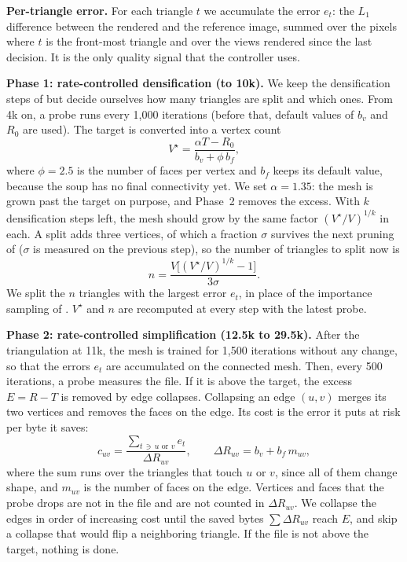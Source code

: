 \noindent\textbf{Per-triangle error.} For each triangle $t$ we accumulate the error $e_t$: the $L_1$ difference between the rendered and the reference image, summed over the pixels where $t$ is the front-most triangle and over the views rendered since the last decision. It is the only quality signal that the controller uses.

\noindent\textbf{Phase 1: rate-controlled densification (to 10k).} We keep the densification steps of \MS but decide ourselves how many triangles are split and which ones. From 4k on, a probe runs every 1{,}000 iterations (before that, default values of $b_v$ and $R_0$ are used). The target is converted into a vertex count
\begin{equation}
V^\star = \frac{\alpha T - R_0}{b_v + \phi\, b_f},
\label{eq:vstar}
\end{equation}
where $\phi = 2.5$ is the number of faces per vertex and $b_f$ keeps its default value, because the soup has no final connectivity yet. We set $\alpha = 1.35$: the mesh is grown past the target on purpose, and Phase~2 removes the excess. With $k$ densification steps left, the mesh should grow by the same factor $(V^\star/V)^{1/k}$ in each. A split adds three vertices, of which a fraction $\sigma$ survives the next pruning of \MS ($\sigma$ is measured on the previous step), so the number of triangles to split now is
\begin{equation}
n = \frac{V\big[(V^\star/V)^{1/k}-1\big]}{3\sigma}.
\label{eq:n}
\end{equation}
We split the $n$ triangles with the largest error $e_t$, in place of the importance sampling of \MS. $V^\star$ and $n$ are recomputed at every step with the latest probe.

\noindent\textbf{Phase 2: rate-controlled simplification (12.5k to 29.5k).} After the triangulation at 11k, the mesh is trained for 1{,}500 iterations without any change, so that the errors $e_t$ are accumulated on the connected mesh. Then, every 500 iterations, a probe measures the file. If it is above the target, the excess $E = R - T$ is removed by edge collapses. Collapsing an edge $(u,v)$ merges its two vertices and removes the faces on the edge. Its cost is the error it puts at risk per byte it saves:
\begin{equation}
c_{uv} = \frac{\sum_{t \,\ni\, u \text{ or } v} e_t}{\Delta R_{uv}}, \qquad \Delta R_{uv} = b_v + b_f\, m_{uv},
\label{eq:cost}
\end{equation}
where the sum runs over the triangles that touch $u$ or $v$, since all of them change shape, and $m_{uv}$ is the number of faces on the edge. Vertices and faces that the probe drops are not in the file and are not counted in $\Delta R_{uv}$. We collapse the edges in order of increasing cost until the saved bytes $\sum \Delta R_{uv}$ reach $E$, and skip a collapse that would flip a neighboring triangle. If the file is not above the target, nothing is done.

